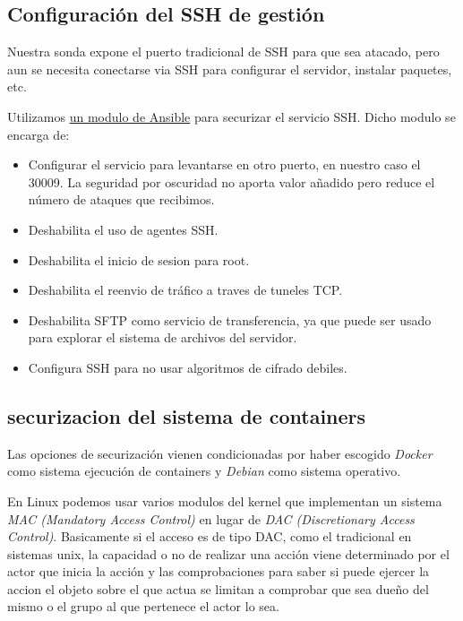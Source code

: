 \subsection{Configuración del SSH de gestión}

Nuestra sonda expone el puerto tradicional de SSH para que sea atacado, pero aun se necesita conectarse via SSH para configurar el servidor,
instalar paquetes, etc.

Utilizamos \href{https://github.com/dev-sec/ansible-ssh-hardening}{un modulo de Ansible} para securizar el servicio SSH. 
Dicho modulo se encarga de:

\begin{itemize}
    \item Configurar el servicio para levantarse en otro puerto, en nuestro caso el 30009. 
    La seguridad por oscuridad no aporta valor añadido pero reduce el número de ataques que recibimos. 
    \item Deshabilita el uso de agentes SSH.
    \item Deshabilita el inicio de sesion para root.
    \item Deshabilita el reenvio de tráfico a traves de tuneles TCP.
    \item Deshabilita SFTP como servicio de transferencia, ya que puede ser usado para explorar el sistema de archivos del servidor.
    \item Configura SSH para no usar algoritmos de cifrado debiles. 
\end{itemize}

\subsection{securizacion del sistema de containers}

Las opciones de securización vienen condicionadas por haber escogido \emph{Docker} como sistema ejecución de containers
y \emph{Debian} como sistema operativo. 

En Linux podemos usar varios modulos del kernel que implementan un sistema \emph{MAC (Mandatory Access Control)} en lugar de \emph{DAC (Discretionary Access Control)}. 
Basicamente si el acceso es de tipo DAC, como el tradicional en sistemas unix, la capacidad o no de realizar una acción viene determinado por el actor que inicia la acción y las comprobaciones
para saber si puede ejercer la accion el objeto sobre el que actua se limitan a comprobar que sea dueño del mismo o el grupo al que pertenece el actor lo sea.

